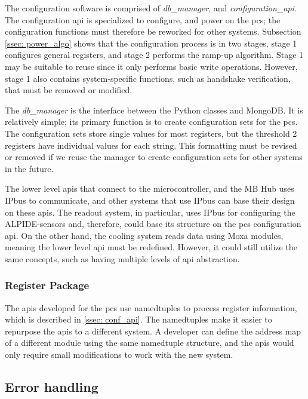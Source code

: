 \documentclass[main.tex]{subfiles}
\begin{document}
The configuration software is comprised of \textit{db\_manager}, and \textit{configuration\_api}. The configuration \gls{api} is specialized to configure, and power on the \gls{pcs}; the configuration functions must therefore be reworked for other systems. Subsection \ref{ssec: power_algo} shows that the configuration process is in two stages, stage 1 configures general registers, and stage 2 performs the ramp-up algorithm. Stage 1 may be suitable to reuse since it only performs basic write operations. However, stage 1 also contains system-specific functions, such as handshake verification, that must be removed or modified.

The \textit{db\_manager} is the interface between the Python classes and MongoDB. It is relatively simple; its primary function is to create configuration sets for the \gls{pcs}. The configuration sets store single values for most registers, but the threshold 2 registers have individual values for each string. This formatting must be revised or removed if we reuse the manager to create configuration sets for other systems in the future. 

The lower level \gls{api}s that connect to the microcontroller, and the MB Hub uses IPbus to communicate, and other systems that use IPbus can base their design on these \gls{api}s. The readout system, in particular, uses IPbus for configuring the ALPIDE-sensors and, therefore, could base its structure on the \gls{pcs} configuration \gls{api}. On the other hand, the cooling system reads data using Moxa modules, meaning the lower level \gls{api} must be redefined. However, it could still utilize the same concepts, such as having multiple levels of \gls{api} abstraction.
 
 \subsubsection{Register Package}
 
The \gls{api}s developed for the \gls{pcs} use namedtuples to process register information, which is described in \autoref{ssec: conf_api}. The namedtuples make it easier to repurpose the \gls{api}s to a different system. A developer can define the address map of a different module using the same namedtuple structure, and the \gls{api}s would only require small modifications to work with the new system.



\subsection{Error handling}
\end{document}
